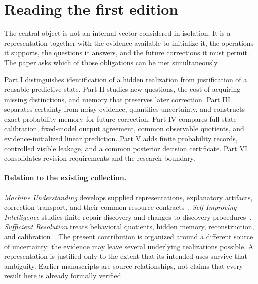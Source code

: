 \documentclass[11pt,letterpaper]{article}
\theoremstyle{plain}
\theoremstyle{definition}
\begin{document}
\hypersetup{pageanchor=true}
\begingroup\small\setlength{\parskip}{0pt}\tableofcontents\endgroup
\clearpage
\section*{Reading the first edition}
The central object is not an internal vector considered in isolation. It is a representation together with the evidence available to initialize it, the operations it supports, the questions it answers, and the future corrections it must permit. The paper asks which of those obligations can be met simultaneously.

Part I distinguishes identification of a hidden realization from justification of a reusable predictive state. Part II studies new questions, the cost of acquiring missing distinctions, and memory that preserves later correction. Part III separates certainty from noisy evidence, quantifies uncertainty, and constructs exact probability memory for future correction. Part IV compares full-state calibration, fixed-model output agreement, common observable quotients, and evidence-initialized linear prediction. Part V adds finite probability records, controlled visible leakage, and a common posterior decision certificate. Part VI consolidates revision requirements and the research boundary.

\paragraph{Relation to the existing collection.}
\emph{Machine Understanding} develops supplied representations, explanatory artifacts, correction transport, and their common resource contracts~\cite{understanding}. \emph{Self-Improving Intelligence} studies finite repair discovery and changes to discovery procedures~\cite{selfimproving}. \emph{Sufficient Resolution} treats behavioral quotients, hidden memory, reconstruction, and calibration~\cite{resolution}. The present contribution is organized around a different source of uncertainty: the evidence may leave several underlying realizations possible. A representation is justified only to the extent that its intended uses survive that ambiguity. Earlier manuscripts are source relationships, not claims that every result here is already formally verified.
\end{document}

